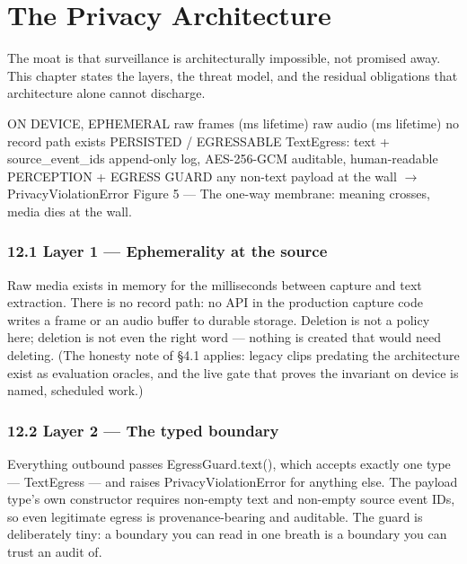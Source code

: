 \chapter{The Privacy Architecture}\label{the-privacy-architecture}

The moat is that surveillance is architecturally impossible, not promised away. This chapter states the layers, the threat model, and the residual obligations that architecture alone cannot discharge.

ON DEVICE, EPHEMERAL \textperiodcentered{} raw frames (ms lifetime) \textperiodcentered{} raw audio (ms lifetime) \textperiodcentered{} no record path exists PERSISTED / EGRESSABLE \textperiodcentered{} TextEgress: text + source\_event\_ids \textperiodcentered{} append-only log, AES-256-GCM \textperiodcentered{} auditable, human-readable PERCEPTION + EGRESS GUARD any non-text payload at the wall \(\rightarrow\) PrivacyViolationError Figure 5 --- The one-way membrane: meaning crosses, media dies at the wall.

\subsection{12.1 Layer 1 --- Ephemerality at the source}\label{layer-1-ephemerality-at-the-source}

Raw media exists in memory for the milliseconds between capture and text extraction. There is no record path: no API in the production capture code writes a frame or an audio buffer to durable storage. Deletion is not a policy here; deletion is not even the right word --- nothing is created that would need deleting. (The honesty note of \S{}4.1 applies: legacy clips predating the architecture exist as evaluation oracles, and the live gate that proves the invariant on device is named, scheduled work.)

\subsection{12.2 Layer 2 --- The typed boundary}\label{layer-2-the-typed-boundary}

Everything outbound passes EgressGuard.text(), which accepts exactly one type --- TextEgress --- and raises PrivacyViolationError for anything else. The payload type's own constructor requires non-empty text and non-empty source event IDs, so even legitimate egress is provenance-bearing and auditable. The guard is deliberately tiny: a boundary you can read in one breath is a boundary you can trust an audit of.

